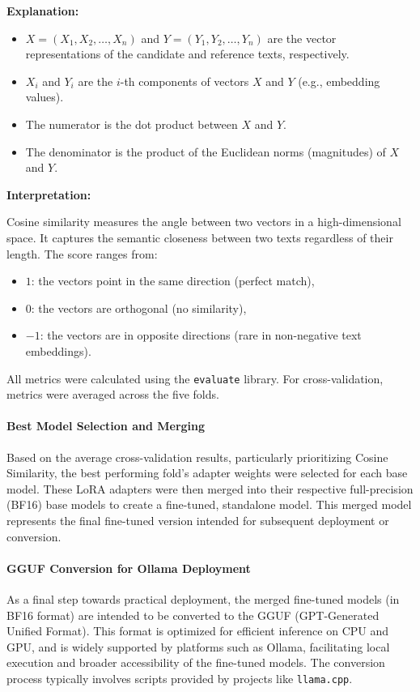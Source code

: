 \documentclass[conference]{IEEEtran}
\begin{document}
\textbf{Explanation:}
\begin{itemize}
  \item $X = (X_1, X_2, \dots, X_n)$ and $Y = (Y_1, Y_2, \dots, Y_n)$ are the vector representations of the candidate and reference texts, respectively.
  \item $X_i$ and $Y_i$ are the $i$-th components of vectors $X$ and $Y$ (e.g., embedding values).
  \item The numerator is the dot product between $X$ and $Y$.
  \item The denominator is the product of the Euclidean norms (magnitudes) of $X$ and $Y$.
\end{itemize}

\textbf{Interpretation:}

Cosine similarity measures the angle between two vectors in a high-dimensional space. It captures the semantic closeness between two texts regardless of their length. The score ranges from:
\begin{itemize}
  \item $1$: the vectors point in the same direction (perfect match),
  \item $0$: the vectors are orthogonal (no similarity),
  \item $-1$: the vectors are in opposite directions (rare in non-negative text embeddings).
\end{itemize}

All metrics were calculated using the \texttt{evaluate} library. For cross-validation, metrics were averaged across the five folds.

\paragraph{Best Model Selection and Merging}
Based on the average cross-validation results, particularly prioritizing Cosine Similarity, the best performing fold's adapter weights were selected for each base model. These LoRA adapters were then merged into their respective full-precision (BF16) base models to create a fine-tuned, standalone model. This merged model represents the final fine-tuned version intended for subsequent deployment or conversion.

\paragraph{GGUF Conversion for Ollama Deployment}
\label{sec:gguf_conversion}
As a final step towards practical deployment, the merged fine-tuned models (in BF16 format) are intended to be converted to the GGUF (GPT-Generated Unified Format). This format is optimized for efficient inference on CPU and GPU, and is widely supported by platforms such as Ollama, facilitating local execution and broader accessibility of the fine-tuned models. The conversion process typically involves scripts provided by projects like \texttt{llama.cpp}.
\end{document}
